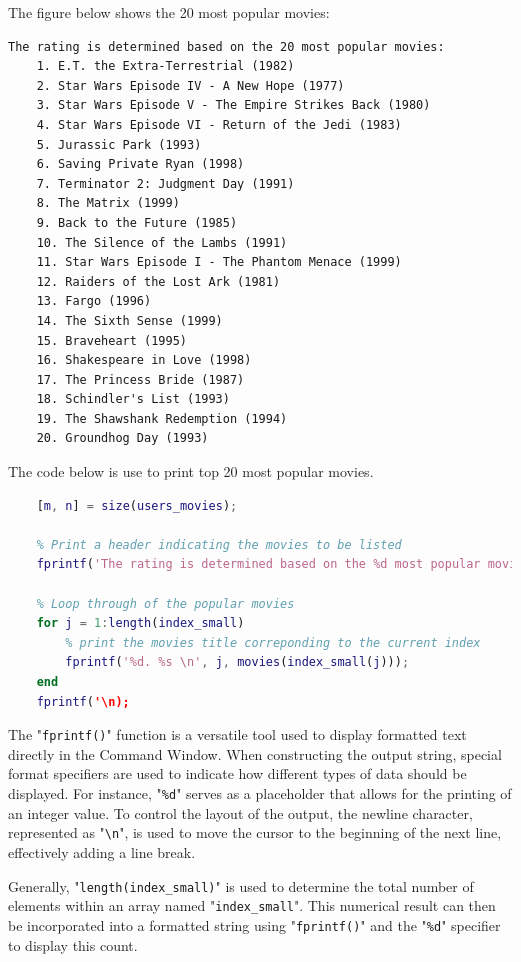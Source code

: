 The figure below shows the 20 most popular movies:

\begin{lstlisting}[style=StyleResult]
	The rating is determined based on the 20 most popular movies:
	1. E.T. the Extra-Terrestrial (1982)
	2. Star Wars Episode IV - A New Hope (1977)
	3. Star Wars Episode V - The Empire Strikes Back (1980)
	4. Star Wars Episode VI - Return of the Jedi (1983)
	5. Jurassic Park (1993)
	6. Saving Private Ryan (1998)
	7. Terminator 2: Judgment Day (1991)
	8. The Matrix (1999)
	9. Back to the Future (1985)
	10. The Silence of the Lambs (1991)
	11. Star Wars Episode I - The Phantom Menace (1999)
	12. Raiders of the Lost Ark (1981)
	13. Fargo (1996)
	14. The Sixth Sense (1999)
	15. Braveheart (1995)
	16. Shakespeare in Love (1998)
	17. The Princess Bride (1987)
	18. Schindler's List (1993)
	19. The Shawshank Redemption (1994)
	20. Groundhog Day (1993)
\end{lstlisting}

The code below is use to print top 20 most popular movies.

\begin{lstlisting}[style=StyleCode, language=MATLAB]
	% Get the dimensions
	[m, n] = size(users_movies);
	
	% Print a header indicating the movies to be listed
	fprintf('The rating is determined based on the %d most popular movies: \n', length(index_small))
	
	% Loop through of the popular movies
	for j = 1:length(index_small)
		% print the movies title correponding to the current index
		fprintf('%d. %s \n', j, movies(index_small(j)));
	end
	fprintf('\n);
\end{lstlisting}

The "\texttt{fprintf()}" function is a versatile tool used to display formatted text directly in the Command Window. When constructing the output string, special format specifiers are used to indicate how different types of data should be displayed. For instance, "\texttt{\%d}" serves as a placeholder that allows for the printing of an integer value. To control the layout of the output, the newline character, represented as "\texttt{\textbackslash n}", is used to move the cursor to the beginning of the next line, effectively adding a line break.

Generally, "\texttt{length(index\_small)}" is used to determine the total number of elements within an array named "\texttt{index\_small}". This numerical result can then be incorporated into a formatted string using "\texttt{fprintf()}" and the "\texttt{\%d}" specifier to display this count.


